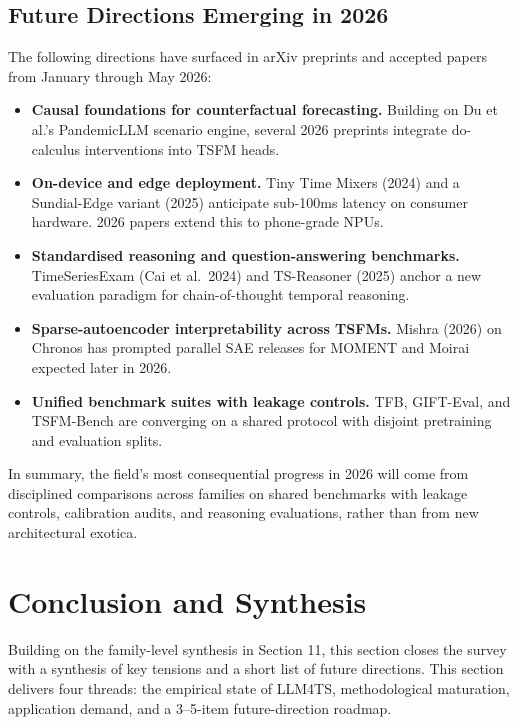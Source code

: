 \subsection{Future Directions Emerging in 2026}\label{future-directions-emerging-in-2026}

The following directions have surfaced in arXiv preprints and accepted papers from January through May 2026:

\begin{itemize}
\tightlist
\item
  \textbf{Causal foundations for counterfactual forecasting.} Building on Du et al.'s PandemicLLM scenario engine, several 2026 preprints integrate do-calculus interventions into TSFM heads.
\item
  \textbf{On-device and edge deployment.} Tiny Time Mixers (2024) and a Sundial-Edge variant (2025) anticipate sub-100ms latency on consumer hardware. 2026 papers extend this to phone-grade NPUs.
\item
  \textbf{Standardised reasoning and question-answering benchmarks.} TimeSeriesExam (Cai et al.~2024) and TS-Reasoner (2025) anchor a new evaluation paradigm for chain-of-thought temporal reasoning.
\item
  \textbf{Sparse-autoencoder interpretability across TSFMs.} Mishra (2026) on Chronos has prompted parallel SAE releases for MOMENT and Moirai expected later in 2026.
\item
  \textbf{Unified benchmark suites with leakage controls.} TFB, GIFT-Eval, and TSFM-Bench are converging on a shared protocol with disjoint pretraining and evaluation splits.
\end{itemize}

In summary, the field's most consequential progress in 2026 will come from disciplined comparisons across families on shared benchmarks with leakage controls, calibration audits, and reasoning evaluations, rather than from new architectural exotica.

\section{Conclusion and Synthesis}\label{conclusion-and-synthesis}

Building on the family-level synthesis in Section 11, this section closes the survey with a synthesis of key tensions and a short list of future directions. This section delivers four threads: the empirical state of LLM4TS, methodological maturation, application demand, and a 3--5-item future-direction roadmap.

